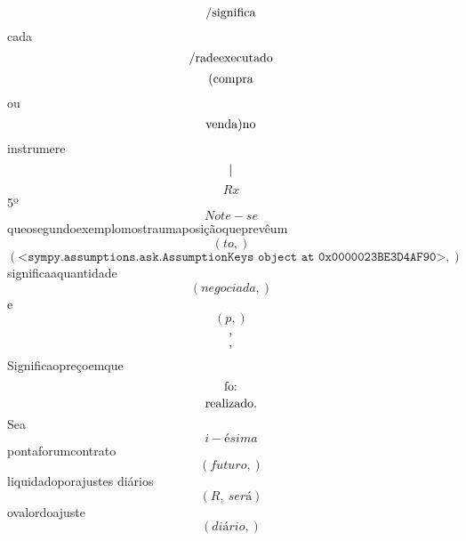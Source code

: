 \documentclass{article}
\begin{document}
\begin{equation}
$/significa$
\end{equation}cada\begin{equation}
$/radeexecutado$
\end{equation}\begin{equation}
$(compra$
\end{equation}ou\begin{equation}
$venda)no$
\end{equation}instrumere\begin{equation}
$|$
\end{equation}\begin{equation}
R x
\end{equation}5º\begin{equation}
Note - se
\end{equation}queosegundoexemplomostraumaposiçãoqueprevêum\begin{equation}
\left( to,\right)
\end{equation}\begin{equation}
\left( \mathtt{\text{<sympy.assumptions.ask.AssumptionKeys object at 0x0000023BE3D4AF90>}},\right)
\end{equation}significaaquantidade\begin{equation}
\left( negociada,\right)
\end{equation}e\begin{equation}
\left( p,\right)
\end{equation}\begin{equation}
$,$
\end{equation}\begin{equation}
$,$
\end{equation}Significaopreçoemque\begin{equation}
$fo:$
\end{equation}\begin{equation}
$realizado.$
\end{equation}Sea\begin{equation}
i - ésima
\end{equation}pontaforumcontrato\begin{equation}
\left( futuro,\right)
\end{equation}liquidadoporajustes diários\begin{equation}
\left( R, \  será\right)
\end{equation}ovalordoajuste\begin{equation}
\left( diário,\right)
\end{equation}\begin{equation}

\end{equation}
\end{document}
